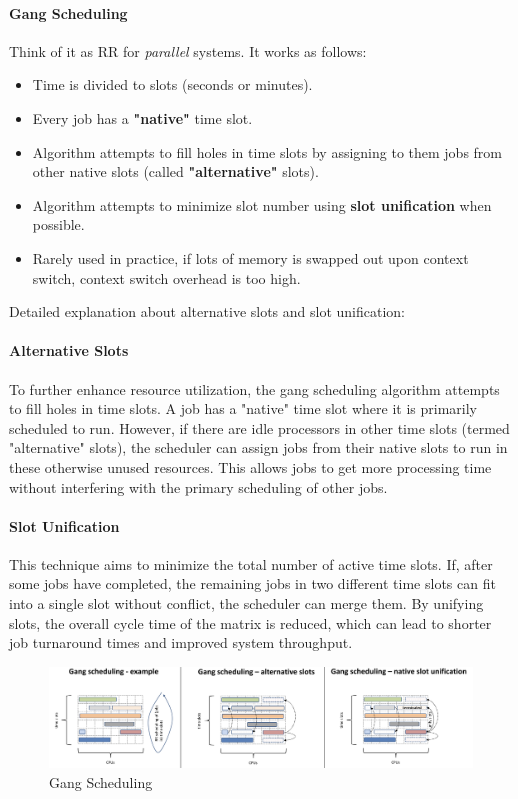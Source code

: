 \documentclass[openany,12pt]{book}
\begin{document}
\paragraph{Gang Scheduling} Think of it as RR for \textit{parallel} systems. It works as follows:
\begin{itemize}
    \item Time is divided to slots (seconds or minutes).
    \item Every job has a \textbf{"native"} time slot.
    \item Algorithm attempts to fill holes in time slots by assigning to them jobs from other native slots (called \textbf{"alternative"} slots).
    \item Algorithm attempts to minimize slot number using \textbf{slot unification} when possible.
    \item Rarely used in practice, if lots of memory is swapped out upon context switch, context switch overhead is too high.
\end{itemize}
Detailed explanation about alternative slots and slot unification:

\paragraph{Alternative Slots} To further enhance resource utilization, the gang scheduling algorithm attempts to fill holes in time slots. A job has a "native" time slot where it is primarily scheduled to run. However, if there are idle processors in other time slots (termed "alternative" slots), the scheduler can assign jobs from their native slots to run in these otherwise unused resources. This allows jobs to get more processing time without interfering with the primary scheduling of other jobs.

\paragraph{Slot Unification}This technique aims to minimize the total number of active time slots. If, after some jobs have completed, the remaining jobs in two different time slots can fit into a single slot without conflict, the scheduler can merge them. By unifying slots, the overall cycle time of the matrix is reduced, which can lead to shorter job turnaround times and improved system throughput.

\begin{figure}[H]
    \centering
    \includegraphics[width=1\textwidth]{GangScheduling.png}
    \caption{Gang Scheduling}
    \label{fig:Gang_Scheduling}
\end{figure}
\end{document}
